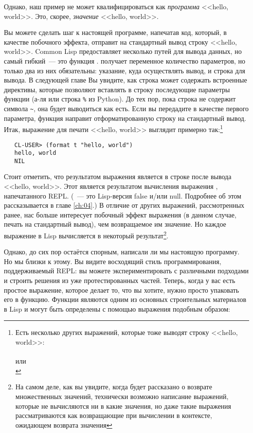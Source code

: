 Однако, наш пример не может квалифицироваться как \emph{программа} <<hello, world>>.
Это, скорее, \emph{значение} <<hello, world>>.

Вы можете сделать шаг к настоящей программе, напечатав код, который, в качестве побочного
эффекта, отправит на стандартный вывод строку <<hello, world>>. Common Lisp предоставляет
несколько путей для вывода данных, но самый гибкий~--- это функция .  получает
переменное количество параметров, но только два из них обязательны: указание, куда
осуществлять вывод, и строка для вывода. В следующей главе Вы увидите, как строка может
содержать встроенные директивы, которые позволяют вставлять в строку последующие параметры
функции (а-ля  или строка \lstinline|%| из Python). До тех пор, пока строка
не содержит символа \lstinline|~|, она будет выводиться как есть. Если вы передадите  в
качестве первого параметра, функция  направит отформатированную строку на
стандартный вывод. Итак, выражение  для печати <<hello, world>> выглядит примерно
так:\footnote{Есть несколько других выражений, которые тоже выводят строку <<hello, world>>:\\
   \\
  или \\
  }

\begin{verbatim}
   CL-USER> (format t "hello, world")
   hello, world
   NIL
\end{verbatim}

Стоит отметить, что результатом выражения  является  в строке после
вывода <<hello, world>>. Этот  является результатом вычисления выражения ,
напечатанного REPL. (~--- это Lisp-версия false и/или null. Подробнее об этом
рассказывается в главе \ref{ch:04}.) В отличие от других выражений, рассмотренных ранее, нас больше
интересует побочный эффект выражения  (в данном случае, печать на стандартный
вывод), чем возвращаемое им значение. Но каждое выражение в Lisp вычисляется в некоторый
результат\footnote{На самом деле, как вы увидите, когда будет рассказано о возврате
  множественных значений, технически возможно написание выражений, которые не вычисляются
  ни в какие значения, но даже такие выражения рассматриваются как возвращающие  при
  вычислении в контексте, ожидающем возврата значения}.

Однако, до сих пор остаётся спорным, написали ли мы настоящую программу. Но мы близки к этому.
Вы видите восходящий стиль программирования, поддерживаемый REPL: вы можете
экспериментировать с различными подходами и строить решения из уже протестированных
частей. Теперь, когда у вас есть простое выражение, которое делает то, что вы хотите,
нужно просто упаковать его в функцию. Функции являются одним из основных строительных
материалов в Lisp и могут быть определены с помощью выражения  подобным образом:

